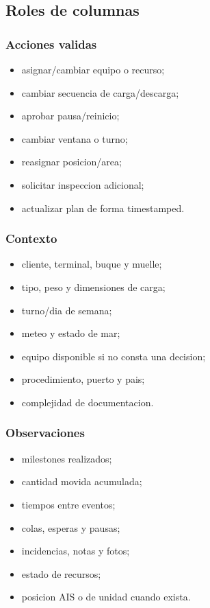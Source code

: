 \documentclass[
  spanish,
  10pt,
  a4paper,
]{article}
\providecommand{\tightlist}{%
  \setlength{\itemsep}{0pt}\setlength{\parskip}{0pt}}
\begin{document}
\subsection{Roles de columnas}\label{roles-de-columnas}

\subsubsection{Acciones validas}\label{acciones-validas}

\begin{itemize}
\tightlist
\item
  asignar/cambiar equipo o recurso;
\item
  cambiar secuencia de carga/descarga;
\item
  aprobar pausa/reinicio;
\item
  cambiar ventana o turno;
\item
  reasignar posicion/area;
\item
  solicitar inspeccion adicional;
\item
  actualizar plan de forma timestamped.
\end{itemize}

\subsubsection{Contexto}\label{contexto}

\begin{itemize}
\tightlist
\item
  cliente, terminal, buque y muelle;
\item
  tipo, peso y dimensiones de carga;
\item
  turno/dia de semana;
\item
  meteo y estado de mar;
\item
  equipo disponible si no consta una decision;
\item
  procedimiento, puerto y pais;
\item
  complejidad de documentacion.
\end{itemize}

\subsubsection{Observaciones}\label{observaciones}

\begin{itemize}
\tightlist
\item
  milestones realizados;
\item
  cantidad movida acumulada;
\item
  tiempos entre eventos;
\item
  colas, esperas y pausas;
\item
  incidencias, notas y fotos;
\item
  estado de recursos;
\item
  posicion AIS o de unidad cuando exista.
\end{itemize}
\end{document}
